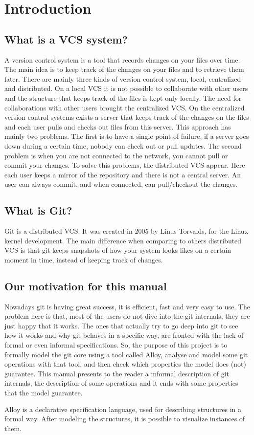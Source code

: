 \section{Introduction}
\subsection{What is a VCS system?}
A version control system is a tool that records changes on your
files over time. The main idea is to keep track of the changes on your
files and to retrieve them later. There are mainly three kinds of 
version control system, local, centralized and distributed. On
a local VCS it is not possible to collaborate with other users and
the structure that keeps track of the files is kept only locally. The
need for collaborations with other users brought the centralized VCS.
On the centralized version control systems exists a server that keeps
track of the changes on the files and each user pulls and checks out files
from this server. This approach has mainly two problems. The
first is to have a single point of failure, if a server goes down
during a certain time, nobody can check out or pull updates. The
second problem is when you are not connected to the network, you
cannot pull or commit your changes. To solve this problems, the
distributed VCS appear. Here each user keeps a mirror of the
repository and there is not a central server. An user can always commit,
and when connected, can pull/checkout the changes.\\
\subsection{What is Git?}
Git is a distributed VCS. It was created in 2005 by Linus Torvalds,
for the Linux kernel development. The main difference when comparing to
others distributed VCS is that git keeps snapshots of how your system
looks likes on a certain moment in time, instead of keeping track of
changes.\\
\subsection{Our motivation for this manual}
Nowadays git is having great success, it is efficient, fast and very
easy to use. The problem here is that, most of the users do not dive
into the git internals, they are just happy that it works. The ones
that actually try to go deep into git to see how it works and why git
behaves in a specific way, are fronted with the lack of formal or even
informal specifications.  So, the purpose of this project is to
formally model the git core using a tool called 
Alloy, analyse and model some git
operations with that tool, and then check which properties the model does (not)
guarantee. This manual presents to the reader a informal description of
git internals, the description of some operations and it ends with
some properties that the model guarantee.\par
Alloy is a declarative specification language, used for describing structures in 
a formal way. After modeling the structures, it is possible to visualize 
instances of them. \par

